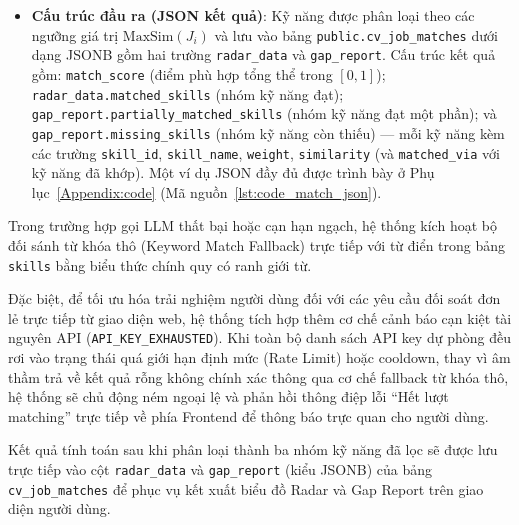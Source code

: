 \begin{itemize}
\begin{itemize}
\begin{equation}
        \text{MatchScore} = \frac{\sum_{i=1}^{n} w_i \cdot \text{MaxSim}(J_i)}{\sum_{i=1}^{n} w_i}
        \end{equation}
    \end{itemize}
    \item \textbf{Cấu trúc đầu ra (JSON kết quả)}:
    Kỹ năng được phân loại theo các ngưỡng giá trị $\text{MaxSim}(J_i)$ và lưu vào bảng \texttt{public.cv\_job\_matches} dưới dạng JSONB gồm hai trường \texttt{radar\_data} và \texttt{gap\_report}. Cấu trúc kết quả gồm: \texttt{match\_score} (điểm phù hợp tổng thể trong $[0,1]$); \texttt{radar\_data.\allowbreak matched\_skills} (nhóm kỹ năng đạt); \texttt{gap\_report.\allowbreak partially\_matched\_skills} (nhóm kỹ năng đạt một phần); và \texttt{gap\_report.\allowbreak missing\_skills} (nhóm kỹ năng còn thiếu) --- mỗi kỹ năng kèm các trường \texttt{skill\_id}, \texttt{skill\_name}, \texttt{weight}, \texttt{similarity} (và \texttt{matched\_via} với kỹ năng đã khớp). Một ví dụ JSON đầy đủ được trình bày ở Phụ lục~\ref{Appendix:code} (Mã nguồn~\ref{lst:code_match_json}).
\end{itemize}
\vspace{2mm}

Trong trường hợp gọi LLM thất bại hoặc cạn hạn ngạch, hệ thống kích hoạt bộ đối sánh từ khóa thô (Keyword Match Fallback) trực tiếp với từ điển trong bảng \texttt{skills} bằng biểu thức chính quy có ranh giới từ.

Đặc biệt, để tối ưu hóa trải nghiệm người dùng đối với các yêu cầu đối soát đơn lẻ trực tiếp từ giao diện web, hệ thống tích hợp thêm cơ chế cảnh báo cạn kiệt tài nguyên API (\texttt{API\_KEY\_EXHAUSTED}). Khi toàn bộ danh sách API key dự phòng đều rơi vào trạng thái quá giới hạn định mức (Rate Limit) hoặc cooldown, thay vì âm thầm trả về kết quả rỗng không chính xác thông qua cơ chế fallback từ khóa thô, hệ thống sẽ chủ động ném ngoại lệ và phản hồi thông điệp lỗi ``Hết lượt matching'' trực tiếp về phía Frontend để thông báo trực quan cho người dùng.

Kết quả tính toán sau khi phân loại thành ba nhóm kỹ năng đã lọc sẽ được lưu trực tiếp vào cột \texttt{radar\_data} và \texttt{gap\_report} (kiểu JSONB) của bảng \texttt{cv\_job\_matches} để phục vụ kết xuất biểu đồ Radar và Gap Report trên giao diện người dùng.
